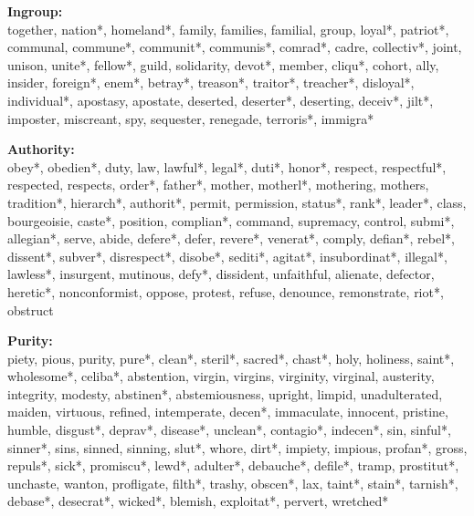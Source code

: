 \documentclass[12pt]{article}
\begin{document}
\textbf{Ingroup:}\\
together, nation*, homeland*, family, families, familial, group, loyal*, patriot*, communal, commune*, communit*, communis*, comrad*, cadre, collectiv*, joint, unison, unite*, fellow*, guild, solidarity, devot*, member, cliqu*, cohort, ally, insider, foreign*, enem*, betray*, treason*, traitor*, treacher*, disloyal*, individual*, apostasy, apostate, deserted, deserter*, deserting, deceiv*, jilt*, imposter, miscreant, spy, sequester, renegade, terroris*, immigra*
\vspace{.5cm}

\textbf{Authority:}\\
obey*, obedien*, duty, law, lawful*, legal*, duti*, honor*, respect, respectful*, respected, respects, order*, father*, mother, motherl*, mothering, mothers, tradition*, hierarch*, authorit*, permit, permission, status*, rank*, leader*, class, bourgeoisie, caste*, position, complian*, command, supremacy, control, submi*, allegian*, serve, abide, defere*, defer, revere*, venerat*, comply, defian*, rebel*, dissent*, subver*, disrespect*, disobe*, sediti*, agitat*, insubordinat*, illegal*, lawless*, insurgent, mutinous, defy*, dissident, unfaithful, alienate, defector, heretic*, nonconformist, oppose, protest, refuse, denounce, remonstrate, riot*, obstruct
\vspace{.5cm}

\textbf{Purity:}\\
piety, pious, purity, pure*, clean*, steril*, sacred*, chast*, holy, holiness, saint*, wholesome*, celiba*, abstention, virgin, virgins, virginity, virginal, austerity, integrity, modesty, abstinen*, abstemiousness, upright, limpid, unadulterated, maiden, virtuous, refined, intemperate, decen*, immaculate, innocent, pristine, humble, disgust*, deprav*, disease*, unclean*, contagio*, indecen*, sin, sinful*, sinner*, sins, sinned, sinning, slut*, whore, dirt*, impiety, impious, profan*, gross, repuls*, sick*, promiscu*, lewd*, adulter*, debauche*, defile*, tramp, prostitut*, unchaste, wanton, profligate, filth*, trashy, obscen*, lax, taint*, stain*, tarnish*, debase*, desecrat*, wicked*, blemish, exploitat*, pervert, wretched*
\vspace{.5cm}

\end{document}
